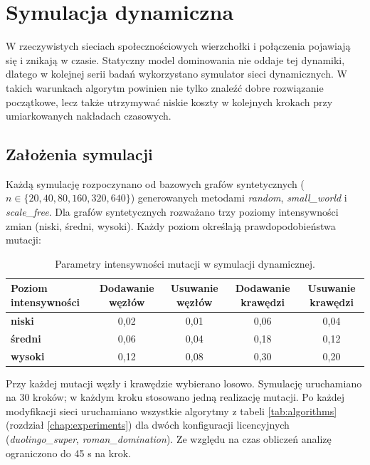 \chapter{Symulacja dynamiczna}\label{chap:dynamic}

W rzeczywistych sieciach społecznościowych wierzchołki i połączenia pojawiają się i znikają w czasie. Statyczny model dominowania nie oddaje tej dynamiki, dlatego w kolejnej serii badań wykorzystano symulator sieci dynamicznych. W takich warunkach algorytm powinien nie tylko znaleźć dobre rozwiązanie początkowe, lecz także utrzymywać niskie koszty w kolejnych krokach przy umiarkowanych nakładach czasowych.

\section{Założenia symulacji}

Każdą symulację rozpoczynano od bazowych grafów syntetycznych ($n\in\{20,40,80,160,320,640\}$) generowanych metodami \emph{random}, \emph{small\_world} i \emph{scale\_free}. Dla grafów syntetycznych rozważano trzy poziomy intensywności zmian (niski, średni, wysoki). Każdy poziom określają prawdopodobieństwa mutacji:

\begin{table}[H]
\centering
\begin{tabular}{|l|c|c|c|c|}
\hline
\textbf{Poziom intensywności} & \textbf{Dodawanie węzłów} & \textbf{Usuwanie węzłów} & \textbf{Dodawanie krawędzi} & \textbf{Usuwanie krawędzi} \\
\hline
\textbf{niski} & 0,02 & 0,01 & 0,06 & 0,04 \\
\textbf{średni} & 0,06 & 0,04 & 0,18 & 0,12 \\
\textbf{wysoki} & 0,12 & 0,08 & 0,30 & 0,20 \\
\hline
\end{tabular}
\caption{Parametry intensywności mutacji w symulacji dynamicznej.}
\label{tab:mutation_params}
\end{table}

Przy każdej mutacji węzły i krawędzie wybierano losowo. Symulację uruchamiano na 30 kroków; w każdym kroku stosowano jedną realizację mutacji. Po każdej modyfikacji sieci uruchamiano wszystkie algorytmy z tabeli \ref{tab:algorithms} (rozdział \ref{chap:experiments}) dla dwóch konfiguracji licencyjnych (\emph{duolingo\_super}, \emph{roman\_domination}). Ze względu na czas obliczeń analizę ograniczono do 45 s na krok.

